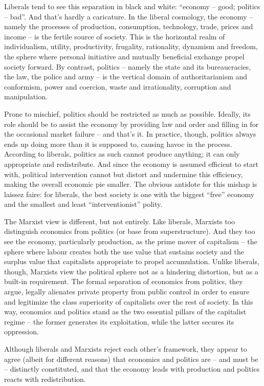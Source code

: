 \documentclass[
]{book}
\begin{document}
Liberals tend to see this separation in black and white: ``economy -- good; politics -- bad''. And
that's hardly a caricature. In the liberal cosmology, the economy -- namely the processes of
production, consumption, technology, trade, prices and income -- is the fertile source of
society. This is the horizontal realm of individualism, utility, productivity, frugality, rationality,
dynamism and freedom, the sphere where personal initiative and mutually beneficial
exchange propel society forward. By contrast, politics -- namely the state and its
bureaucracies, the law, the police and army -- is the vertical domain of authoritarianism and
conformism, power and coercion, waste and irrationality, corruption and manipulation.

Prone to mischief, politics should be restricted as much as possible. Ideally, its role should be
to assist the economy by providing law and order and filling in for the occasional market
failure -- and that's it. In practice, though, politics always ends up doing more than it is
supposed to, causing havoc in the process. According to liberals, politics as such cannot
produce anything; it can only appropriate and redistribute. And since the economy is assumed
efficient to start with, political intervention cannot but distort and undermine this efficiency,
making the overall economic pie smaller. The obvious antidote for this mishap is laissez faire:
for liberals, the best society is one with the biggest ``free'' economy and the smallest and least
``interventionist'' polity.

The Marxist view is different, but not entirely. Like liberals, Marxists too distinguish economics
from politics (or base from superstructure). And they too see the economy, particularly
production, as the prime mover of capitalism -- the sphere where labour creates both the use
value that sustains society and the surplus value that capitalists appropriate to propel
accumulation. Unlike liberals, though, Marxists view the political sphere not as a hindering
distortion, but as a built-in requirement. The formal separation of economics from politics, they
argue, legally alienates private property from public control in order to ensure and legitimize
the class superiority of capitalists over the rest of society. In this way, economics and politics
stand as the two essential pillars of the capitalist regime -- the former generates its
exploitation, while the latter secures its oppression.

Although liberals and Marxists reject each
other's framework, they appear to agree (albeit for different reasons) that economics and
politics are -- and must be -- distinctly constituted, and that the economy leads with production
and politics reacts with redistribution.
\end{document}
